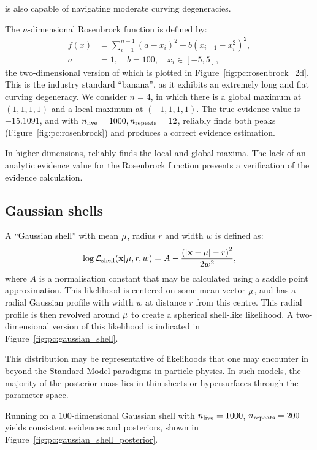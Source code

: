 \PolyChord{} is also capable of navigating moderate curving degeneracies. 

The $n$-dimensional Rosenbrock function is defined by:
\begin{align}
  f(x) &= \sum\limits_{i=1}^{n-1}   {(a-x_i)}^2+ b {(x_{i+1} -x_i^2 )}^2,
    \label{eqn:pc:rosenbrock}
    \\
    a&=1,\quad b=100,\quad x_i\in[-5,5],
\end{align}
the two-dimensional version of which is plotted in Figure~\ref{fig:pc:rosenbrock_2d}. This is the industry standard ``banana'', as it exhibits an extremely long and flat curving degeneracy. We consider ${n=4}$, in which there is a global maximum at $(1,1,1,1)$ and a local maximum at $(-1,1,1,1)$. The true evidence value is $-15.1091$, and with $n_{\mathrm{live}}=1000,n_{\mathrm{repeats}}=12$, \PolyChord{} reliably finds both peaks (Figure~\ref{fig:pc:rosenbrock}) and produces a correct evidence estimation.

In higher dimensions, \PolyChord{} reliably finds the local and global maxima. The lack of an analytic evidence value for the Rosenbrock function prevents a verification of the evidence calculation.

\subsection{Gaussian shells}
\label{sec:pc:gaussian_shells}

A ``Gaussian shell'' with mean $\mathbf{\mu}$, radius $r$ and width $w$ is defined as:
\begin{equation}
  \log\mathcal{L}_{\mathrm{shell}}(\mathbf{x}|\mathbf{\mu},r,w) = A - \frac{{\left(\left|\mathbf{x} - \mathbf{\mu}\right|- r\right)}^2}{2w^2},
  \label{eqn:pc:gaussian_shell}
\end{equation}
where $A$ is a normalisation constant that may be calculated using a saddle point approximation.
This likelihood is centered on some mean vector $\mathbf{\mu}$, and has a radial Gaussian profile with width $w$ at distance $r$ from this centre. This radial profile is then revolved around $\mathbf{\mu}$ to create a spherical shell-like likelihood. A two-dimensional version of this likelihood is indicated in Figure~\ref{fig:pc:gaussian_shell}.

This distribution may be representative of likelihoods that one may encounter in beyond-the-Standard-Model paradigms in particle physics. In such models, the majority of the posterior mass lies in thin sheets or hypersurfaces through the parameter space.

Running \PolyChord{} on a $100$-dimensional Gaussian shell with $n_{\mathrm{live}}=1000$, $n_{\mathrm{repeats}}=200$ yields consistent evidences and posteriors, shown in Figure~\ref{fig:pc:gaussian_shell_posterior}. 
                                                                  
